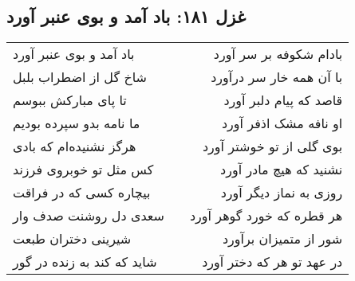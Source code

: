 \begin{center}
\section*{غزل ۱۸۱: باد آمد و بوی عنبر آورد}
\label{sec:181}
\begin{longtable}{l p{0.5cm} r}
باد آمد و بوی عنبر آورد
&&
بادام شکوفه بر سر آورد
\\
شاخ گل از اضطراب بلبل
&&
با آن همه خار سر درآورد
\\
تا پای مبارکش ببوسم
&&
قاصد که پیام دلبر آورد
\\
ما نامه بدو سپرده بودیم
&&
او نافه مشک اذفر آورد
\\
هرگز نشنیده‌ام که بادی
&&
بوی گلی از تو خوشتر آورد
\\
کس مثل تو خوبروی فرزند
&&
نشنید که هیچ مادر آورد
\\
بیچاره کسی که در فراقت
&&
روزی به نماز دیگر آورد
\\
سعدی دل روشنت صدف وار
&&
هر قطره که خورد گوهر آورد
\\
شیرینی دختران طبعت
&&
شور از متمیزان برآورد
\\
شاید که کند به زنده در گور
&&
در عهد تو هر که دختر آورد
\\
\end{longtable}
\end{center}
